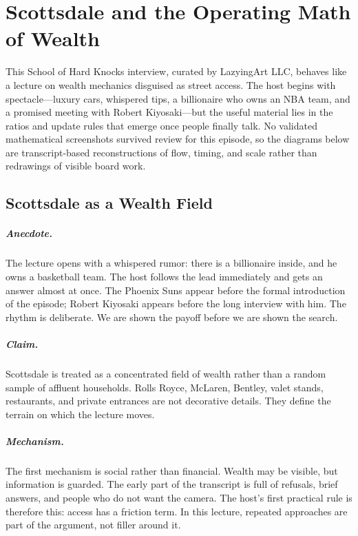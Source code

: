 \chapter{Scottsdale and the Operating Math of Wealth}

This School of Hard Knocks interview, curated by LazyingArt LLC, behaves like a lecture on wealth mechanics disguised as street access. The host begins with spectacle---luxury cars, whispered tips, a billionaire who owns an NBA team, and a promised meeting with Robert Kiyosaki---but the useful material lies in the ratios and update rules that emerge once people finally talk. No validated mathematical screenshots survived review for this episode, so the diagrams below are transcript-based reconstructions of flow, timing, and scale rather than redrawings of visible board work.

\section{Scottsdale as a Wealth Field}

\paragraph{Anecdote.} The lecture opens with a whispered rumor: there is a billionaire inside, and he owns a basketball team. The host follows the lead immediately and gets an answer almost at once. The Phoenix Suns appear before the formal introduction of the episode; Robert Kiyosaki appears before the long interview with him. The rhythm is deliberate. We are shown the payoff before we are shown the search.

\paragraph{Claim.} Scottsdale is treated as a concentrated field of wealth rather than a random sample of affluent households. Rolls Royce, McLaren, Bentley, valet stands, restaurants, and private entrances are not decorative details. They define the terrain on which the lecture moves.

\paragraph{Mechanism.} The first mechanism is social rather than financial. Wealth may be visible, but information is guarded. The early part of the transcript is full of refusals, brief answers, and people who do not want the camera. The host's first practical rule is therefore this: access has a friction term. In this lecture, repeated approaches are part of the argument, not filler around it.

